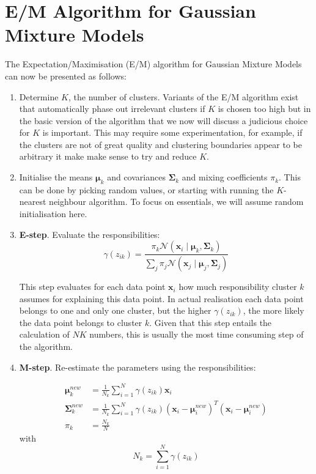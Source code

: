  \section{E/M Algorithm for Gaussian Mixture Models}
 The Expectation/Maximisation (E/M) algorithm for Gaussian Mixture Models can now be presented as follows:

\begin{enumerate}
\item Determine $K$, the number of clusters. Variants of the E/M algorithm exist that automatically phase out irrelevant clusters  if $K$ is chosen too high but in the
  basic version of the algorithm that we now will discuss a judicious choice for $K$ is important. This may require some experimentation, for example, if the
  clusters are not of great quality and clustering boundaries appear to be arbitrary it make make sense to try and reduce $K$.

\item Initialise the means $\boldsymbol{\mu}_k$ and covariances $\boldsymbol{\Sigma}_k$ and mixing coefficients $\pi_k$. This can be done by picking
  random values, or starting with running the $K$-nearest neighbour algorithm. To focus on essentials, we will assume random initialisation here.

\item {\bf E-step}.  Evaluate the responsibilities:
  $$
  \gamma(z_{ik}) = \frac{ \pi_k \mathcal{N}(\boldsymbol{x}_i \mid \boldsymbol{\mu}_k, \boldsymbol{\Sigma}_k) }{\sum_j \pi_j \mathcal{N}(\boldsymbol{x}_j \mid \boldsymbol{\mu}_j, \boldsymbol{\Sigma}_j)}
  $$
  
  This step evaluates for each data point $\boldsymbol{x}_i$ how much responsibility cluster $k$ assumes for explaining this data point. In actual realisation
  each data point belongs to one and only one cluster, but the higher $\gamma(z_{ik})$, the more likely the data point belongs to cluster $k$. Given that
  this step entails the calculation of $NK$ numbers, this is usually the most time consuming step of the algorithm.

\item {\bf M-step}. Re-estimate the parameters using the responsibilities:

  \begin{align}
    \boldsymbol{\mu}^{new}_k &= \frac{1}{N_k} \sum^N_{i=1} \gamma(z_{ik}) \boldsymbol{x}_i \\
    \boldsymbol{\Sigma}^{new}_k & = \frac{1}{N_k} \sum^N_{i=1} \gamma(z_{ik}) (\boldsymbol{x}_i - \boldsymbol{\mu}^{new}_i)^T(\boldsymbol{x}_i - \boldsymbol{\mu}^{new}_i)\\
    \pi_k &= \frac{N_k}{N}
  \end{align}
  with
  \begin{equation}
    N_k = \sum^N_{i=1} \gamma(z_{ik})
  \end{equation}


\end{enumerate}
